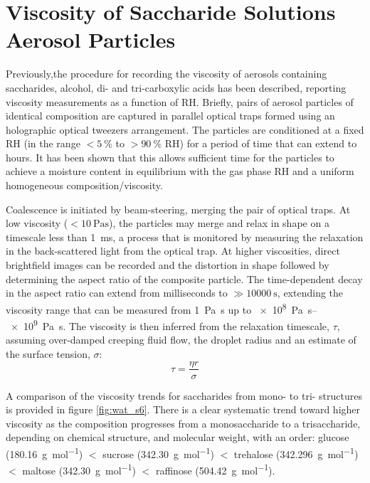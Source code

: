 \section{Viscosity of Saccharide Solutions Aerosol Particles}

Previously,the procedure for recording the viscosity of aerosols containing saccharides, alcohol, di- and tri-carboxylic acids  has been described, reporting viscosity measurements as a function of RH\cite{powerProbingMicrorheologicalProperties2014,Song2016a,powerTransitionLiquidSolidlike2013}. Briefly, pairs of aerosol particles of identical composition are captured in parallel optical traps formed using an holographic optical tweezers arrangement. The particles are conditioned at a fixed RH (in the range $<\SI{5}{\percent}$ to $>\SI{90}{\percent}$ RH) for a period of time that can extend to hours. It has been shown that this allows sufficient time for the particles to achieve a moisture content in equilibrium with the gas phase RH and a uniform homogeneous composition/viscosity\cite{Song2016a}. 

Coalescence is initiated by beam-steering, merging the pair of optical traps. At low viscosity ($<\SI{10}{\pascal\second}$), the particles may merge and relax in shape on a timescale less than \SI{1}{\milli\second}, a process that is monitored by measuring the relaxation in the back-scattered light from the optical trap. At higher viscosities, direct brightfield images can be recorded and the distortion in shape followed by determining the aspect ratio of the composite particle. The time-dependent decay in the aspect ratio can extend from milliseconds to $\gg \SI{10000}{\second}$, extending the viscosity range that can be measured from \SI{1}{\pascal\second}  up to \SIrange[range-phrase=--]{e8}{e9}{\pascal\second}\cite{Song2016a}. The viscosity is then inferred from the relaxation timescale, $\tau$, assuming over-damped creeping fluid flow, the droplet radius and an estimate of the surface tension, $\sigma$:
\begin{equation}
\tau=\frac{\eta r}{\sigma}
\end{equation}

A comparison of the viscosity trends for saccharides from mono- to tri- structures is provided in figure \ref{fig:wat_s6}. There is a clear systematic trend toward higher viscosity as the composition progresses from a monosaccharide to a trisaccharide, depending on chemical structure, and molecular weight, with an order: glucose (\SI{180.16}{\gram\per\mole}) $<$ sucrose (\SI{342.30}{\gram\per\mol}) $<$ trehalose (\SI{342.296}{\gram\per\mol}) $<$ maltose (\SI{342.30}{\gram\per\mol}) $<$ raffinose (\SI{504.42}{\gram\per\mol}).


